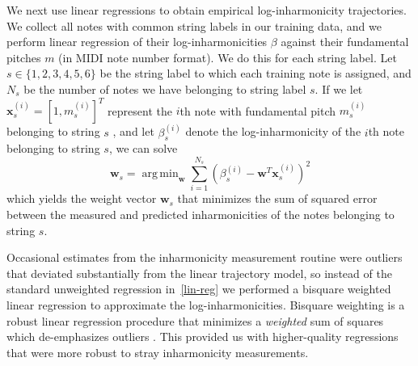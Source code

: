 \documentclass[convention,peer-reviewed]{aesconf}
\DeclareMathOperator*{\argmin}{arg\,min}
\begin{document}
We next use linear regressions to obtain empirical log-inharmonicity trajectories. We collect all notes with common string labels in our training data, and we perform linear regression of their log-inharmonicities $\beta$ against their fundamental pitches $m$ (in MIDI note number format). We do this for each string label. Let $s \in \{1,2,3,4,5,6\}$ be the string label to which each training note is assigned, and $N_s$ be the number of notes we have belonging to string label $s$. If we let $\mathbf{x}_s^{(i)} = [1, m_s^{(i)}]^T$ represent the $i$th note with fundamental pitch $m^{(i)}_s$ belonging to string $s$ , and let $\beta_s^{(i)}$ denote the log-inharmonicity of the $i$th note belonging to string $s$, we can solve
\begin{equation}
\label{lin-reg}
\mathbf{w}_s = \argmin_{\mathbf{w}}{\sum_{i=1}^{N_s}{(\beta^{(i)}_s - \mathbf{w}^T\mathbf{x}^{(i)}_s)^2}}
\end{equation}
which yields the weight vector $\mathbf{w}_s$ that minimizes the sum of squared error between the measured and predicted inharmonicities of the notes belonging to string $s$.

Occasional estimates from the inharmonicity measurement routine were outliers that deviated substantially from the linear trajectory model, so instead of the standard unweighted regression in~\eqref{lin-reg} we performed a bisquare weighted linear regression to approximate the log-inharmonicities. Bisquare weighting is a robust linear regression procedure that minimizes a \textit{weighted} sum of squares which de-emphasizes outliers \citep{matlab-robustfit}. This provided us with higher-quality regressions that were more robust to stray inharmonicity measurements.
\end{document}
